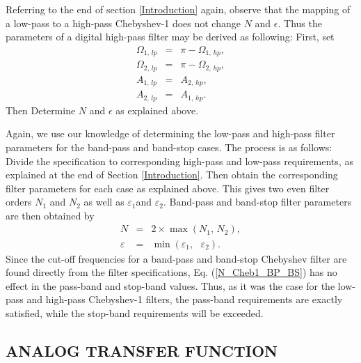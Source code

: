 \documentclass{sebase}
\begin{document}
\begin{remark}
Referring to the end of section \ref{Introduction} again, observe that the
mapping of a low-pass to a high-pass Chebyshev-1 does not change $N$ and $%
\epsilon $. Thus the parameters of a digital high-pass filter may be derived
as following: First, set 
\begin{eqnarray}
\Omega _{1,\,lp} &=&\pi -\Omega _{1,\,hp}, \\
\Omega _{2,\,lp} &=&\pi -\Omega _{2,\,hp}, \\
A_{1,\,lp} &=&A_{2,\,hp}, \\
A_{2,\,lp} &=&A_{1,\,hp}.
\end{eqnarray}
Then Determine $N$ and $\epsilon $ as explained above.
\end{remark}

\begin{remark}
Again, we use our knowledge of determining the low-pass and high-pass filter
parameters for the band-pass and band-stop cases. The process is as follows:
Divide the specification to corresponding high-pass and low-pass
requirements, as explained at the end of Section \ref{Introduction}. Then
obtain the corresponding filter parameters for each case as explained above.
This gives two even filter orders $N_{1}$ and $N_{2}$ as well as $%
\varepsilon _{1}$and $\varepsilon _{2}$. Band-pass and band-stop filter
parameters are then obtained by 
\begin{eqnarray}
N &=&2\times \max \left( N_{1},\,N_{2}\right) ,  \label{N_Cheb1_BP_BS} \\
\varepsilon &=&\min \left( \varepsilon _{1},\text{ }\varepsilon _{2}\right) .
\label{Epsilon_Cheb1_BP_BS}
\end{eqnarray}
Since the cut-off frequencies for a band-pass and band-stop Chebyshev filter
are found directly from the filter specifications, Eq. (\ref{N_Cheb1_BP_BS})
has no effect in the pass-band and stop-band values. Thus, as it was the
case for the low-pass and high-pass Chebyshev-1 filters, the pass-band
requirements are exactly satisfied, while the stop-band requirements will be
exceeded.
\end{remark}

\subsection{ANALOG TRANSFER FUNCTION}
\end{document}
